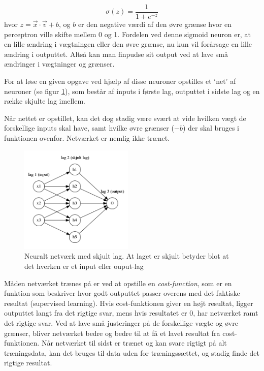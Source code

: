 \begin{equation}
	\sigma(z)=\frac{1}{1+e^{-z}}
\end{equation}
hvor $z=\vec{x}\cdot \vec{v} + b$, og $b$ er den negative værdi af den øvre grænse hvor en perceptron ville skifte mellem 0 og 1. Fordelen ved denne sigmoid neuron er, at en lille ændring i vægtningen eller den øvre grænse, nu kun vil forårsage en lille ændring i outputtet. Altså kan man finpudse sit output ved at lave små ændringer i vægtninger og grænser.

For at løse en given opgave ved hjælp af disse neuroner opstilles et `net' af neuroner (se figur \ref{fig:netvaerk}), som består af inputs i første lag, outputtet i sidste lag og en række skjulte lag imellem. 

Når nettet er opstillet, kan det dog stadig være svært at vide hvilken vægt de forskellige inputs skal have, samt hvilke øvre grænser ($-b$) der skal bruges i funktionen ovenfor. Netværket er nemlig ikke trænet. 
\begin{figure}
  \vspace{-20pt}
  \begin{center}
    \includegraphics[width=0.48\textwidth]{images/neural3.png}
  \end{center}
  \vspace{-20pt}
  \caption{Neuralt netværk med skjult lag. At laget er skjult betyder blot at det hverken er et input eller ouput-lag}
    \label{fig:netvaerk}
  \vspace{-10pt}
\end{figure}
Måden netværket trænes på er ved at opstille en \textit{cost-function}, som er en funktion som beskriver hvor godt outputtet passer overens med det faktiske resultat (supervised learning). Hvis cost-funktionen giver en højt resultat, ligger outputtet langt fra det rigtige svar, mens hvis resultatet er 0, har netværket ramt det rigtige svar. Ved at lave små justeringer på de forskellige vægte og øvre grænser, bliver netværket bedre og bedre til at få et lavet resultat fra cost-funktionen. Når netværket til sidst er trænet og kan svare rigtigt på alt træningsdata, kan det bruges til data uden for træningssættet, og stadig finde det rigtige resultat. 




